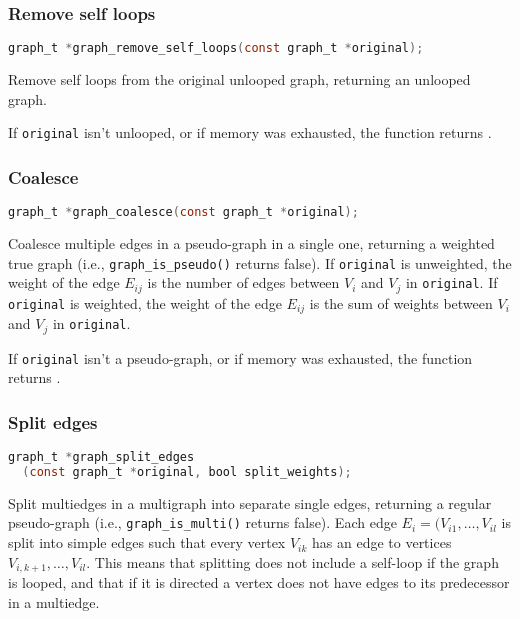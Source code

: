 \subsubsection{Remove self loops}

\begin{lstlisting}[language=C,frame=single]
  graph_t *graph_remove_self_loops(const graph_t *original);
\end{lstlisting}

  Remove self loops from the original unlooped graph, returning an unlooped graph.
  
  If \lstinline!original! isn't unlooped, or if memory was exhausted, the function returns \NULL.

\subsubsection{Coalesce}

\begin{lstlisting}[language=C,frame=single]
  graph_t *graph_coalesce(const graph_t *original);
\end{lstlisting}

  Coalesce multiple edges in a pseudo-graph in a single one, returning a weighted true graph (i.e., \lstinline!graph_is_pseudo()! returns false).
  If \lstinline!original! is unweighted, the weight of the edge $E_{ij}$ is the number of edges between $V_i$ and $V_j$ in \lstinline!original!.
  If \lstinline!original! is weighted, the weight of the edge $E_{ij}$ is the sum of weights between $V_i$ and $V_j$ in \lstinline!original!.
  
  If \lstinline!original! isn't a pseudo-graph, or if memory was exhausted, the function returns \NULL.

\subsubsection{Split edges}

\begin{lstlisting}[language=C,frame=single]
graph_t *graph_split_edges
  (const graph_t *original, bool split_weights);
\end{lstlisting}

  Split multiedges in a multigraph into separate single edges, returning a regular pseudo-graph (i.e., \lstinline!graph_is_multi()! returns false).
  Each edge $E_i = (V_{i1}, \dots, V_{il}$ is split into simple edges such that every vertex $V_{ik}$ has an edge to vertices $V_{i,k+1}, \dots, V_{il}$. This
  means that splitting does not include a self-loop if the graph is looped, and that if it is directed a vertex does not have edges to its predecessor in a 
  multiedge.
  
